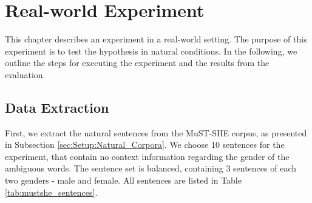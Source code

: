\chapter{Real-world Experiment}
\label{ch:Real_Experiment} 

This chapter describes an experiment in a real-world setting. The purpose of this experiment is to test the hypothesis in natural conditions. In the following, we outline the steps for executing the
experiment and the results from the evaluation.


\section{Data Extraction}
\label{sec:Real_Experiment:Extraction}

First, we extract the natural sentences from the MuST-SHE corpus, as presented in Subsection \ref{sec:Setup:Natural_Corpora}. We choose 10 sentences for the experiment, that contain no context information regarding the gender of the ambiguous words. The sentence set is balanced, containing 3 sentences of each two genders - male and female. All sentences are listed in Table \ref{tab:mustshe_sentences}.

